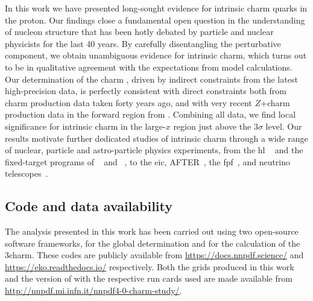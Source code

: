
In this work we have presented long-sought evidence for intrinsic charm quarks
in the proton.
%
Our findings close a fundamental open question in the understanding of nucleon
structure that has been hotly debated by particle and nuclear physicists for
the last 40 years.
%
By carefully disentangling the perturbative component, we obtain unambiguous
evidence for intrinsic charm, which turns out to be in qualitative agreement
with the expectations from model calculations.
%
Our determination of the charm \pdf, driven by indirect constraints from the 
latest high-precision \lhc data, is perfectly consistent with direct
constraints both from \emc charm production data taken forty years ago, and
with very recent $Z$+charm production data in the forward region from \lhcb.
%
Combining all data, we find local significance for intrinsic charm in the
large-$x$ region just above the $3\sigma$ level.
%
Our results motivate further dedicated studies of intrinsic charm through a
wide range of nuclear, particle and astro-particle physics experiments, from
the \acrlong{hl} \lhc~\cite{Azzi:2019yne} and the fixed-target programs of
\lhcb~\cite{LHCb:2018jry} and \alice~\cite{QCDWorkingGroup:2019dyv}, to the  
\acrlong{eic}, AFTER~\cite{Hadjidakis:2018ifr}, the
\acrlong{fpf}~\cite{Anchordoqui:2021ghd}, and neutrino
telescopes~\cite{Halzen:2016thi}.

\subsection*{Code and data availability}

The analysis presented in this work has been carried out using two open-source
software frameworks,  for the global \pdf determination and \eko
for the calculation of the 3\fns charm.
%
These codes are publicly available from \url{https://docs.nnpdf.science/} and
\url{https://eko.readthedocs.io/} respectively.
%
Both the \lhapdf grids produced in this work and the version of \eko with the
respective run cards used are made available from
\url{http://nnpdf.mi.infn.it/nnpdf4-0-charm-study/}.
